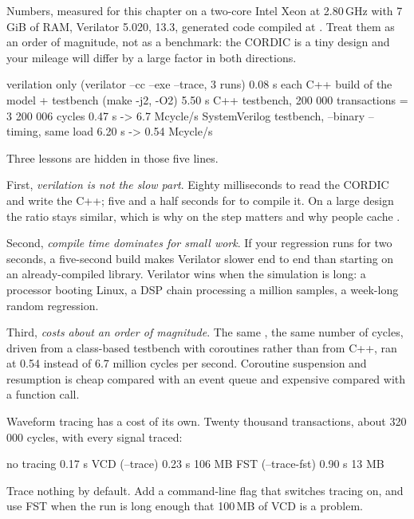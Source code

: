 Numbers, measured for this chapter on a two-core Intel Xeon at 2.80\,GHz with
7\,GiB of RAM, Verilator 5.020,  13.3, generated code compiled at
. Treat them as an order of magnitude, not as a benchmark: the CORDIC
is a tiny design and your mileage will differ by a large factor in both
directions.

\begin{txtcode}
verilation only (verilator --cc --exe --trace, 3 runs)   0.08 s each
C++ build of the model + testbench (make -j2, -O2)       5.50 s
C++ testbench, 200 000 transactions = 3 200 006 cycles   0.47 s
                                                    ->  6.7 Mcycle/s
SystemVerilog testbench, --binary --timing, same load    6.20 s
                                                    ->  0.54 Mcycle/s
\end{txtcode}

Three lessons are hidden in those five lines.

First, \emph{verilation is not the slow part}. Eighty milliseconds to read the
CORDIC and write the C++; five and a half seconds for  to compile it.
On a large design the ratio stays similar, which is why  on the
 step matters and why people cache .

Second, \emph{compile time dominates for small work}. If your regression runs
for two seconds, a five-second build makes Verilator slower end to end than
starting  on an already-compiled library. Verilator wins when the
simulation is long: a processor booting Linux, a DSP chain processing a million
samples, a week-long random regression.

Third, \emph{ costs about an order of magnitude}. The same
\DUT{}, the same number of cycles, driven from a \SV{} class-based testbench
with coroutines rather than from C++, ran at 0.54 instead of 6.7 million cycles
per second. Coroutine suspension and resumption is cheap compared with an event
queue and expensive compared with a function call.

Waveform tracing has a cost of its own. Twenty thousand transactions, about
320\,000 cycles, with every signal traced:

\begin{txtcode}
no tracing                    0.17 s
VCD  (--trace)                0.23 s   106 MB
FST  (--trace-fst)            0.90 s    13 MB
\end{txtcode}

\begin{ruleofthumb}
Trace nothing by default. Add a command-line flag that switches tracing on, and
use FST when the run is long enough that 100\,MB of VCD is a problem.
\end{ruleofthumb}


